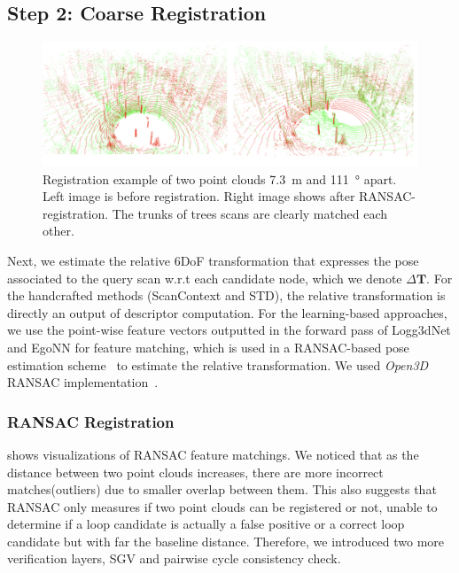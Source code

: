 \subsection*{\textbf{Step 2: Coarse Registration}}
\label{subsubsec:coarse-registration}
\begin{figure}[htbp]
  \centering
  \includegraphics*[width=\columnwidth]{pics/methods_registration.png}
  \caption{Registration example of two point clouds \SI{7.3}{\meter} and \SI{111}{\degree} apart. Left image is before registration. Right image shows after RANSAC-registration. The trunks of trees scans are clearly matched each other. }
  \label{fig:registration_example}
\end{figure}
Next, we estimate the relative 6DoF transformation that expresses the pose associated to the query scan w.r.t each candidate node, which we denote $\Delta \mathbf{T}$. For the handcrafted methods (ScanContext and STD), the relative transformation is directly an output of descriptor computation. For the learning-based approaches, we use the point-wise feature vectors outputted in the forward pass of Logg3dNet and EgoNN for feature matching, which is used in a RANSAC-based pose estimation scheme~\cite{fischler1981ransac} to estimate the relative transformation. We used \emph{Open3D} RANSAC implementation~\cite{zhou2018}.  

\subsubsection*{\textbf{RANSAC Registration}}
 shows visualizations of RANSAC feature matchings. We noticed that as the distance between two point clouds increases, there are more incorrect matches(outliers) due to smaller overlap between them. This also suggests that RANSAC only measures if two point clouds can be registered or not, unable to determine if a loop candidate is actually a false positive or a correct loop candidate but with far the baseline distance. Therefore, we introduced two more verification layers, SGV and pairwise cycle consistency check. 


